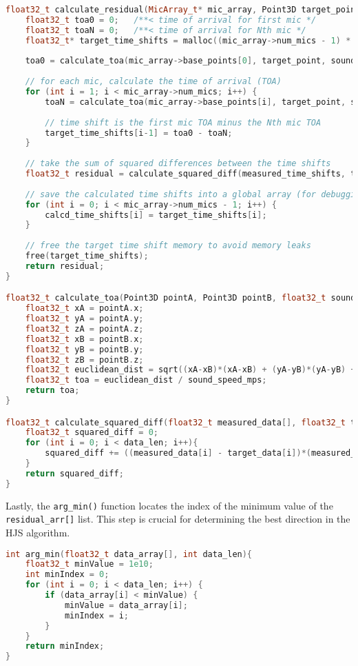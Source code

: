 \documentclass[12pt,a4paper]{report}
\begin{document}
\begin{lstlisting}[language=C++]
float32_t calculate_residual(MicArray_t* mic_array, Point3D target_point, float32_t measured_time_shifts[]) {
	float32_t toa0 = 0;   /**< time of arrival for first mic */
	float32_t toaN = 0;   /**< time of arrival for Nth mic */
	float32_t* target_time_shifts = malloc((mic_array->num_mics - 1) * sizeof(float32_t));
	
	toa0 = calculate_toa(mic_array->base_points[0], target_point, sound_speed_mps);
	
	// for each mic, calculate the time of arrival (TOA)
	for (int i = 1; i < mic_array->num_mics; i++) {
		toaN = calculate_toa(mic_array->base_points[i], target_point, sound_speed_mps);
		
		// time shift is the first mic TOA minus the Nth mic TOA
		target_time_shifts[i-1] = toa0 - toaN;
	}
	
	// take the sum of squared differences between the time shifts
	float32_t residual = calculate_squared_diff(measured_time_shifts, target_time_shifts, mic_array->num_mics - 1);
	
	// save the calculated time shifts into a global array (for debugging / comparing to the real estimates)
	for (int i = 0; i < mic_array->num_mics - 1; i++) {
		calcd_time_shifts[i] = target_time_shifts[i];
	}
	
	// free the target time shift memory to avoid memory leaks
	free(target_time_shifts);
	return residual;
}

float32_t calculate_toa(Point3D pointA, Point3D pointB, float32_t sound_speed_mps) {
	float32_t xA = pointA.x;
	float32_t yA = pointA.y;
	float32_t zA = pointA.z;
	float32_t xB = pointB.x;
	float32_t yB = pointB.y;
	float32_t zB = pointB.z;
	float32_t euclidean_dist = sqrt((xA-xB)*(xA-xB) + (yA-yB)*(yA-yB) + (zA-zB)*(zA-zB));
	float32_t toa = euclidean_dist / sound_speed_mps;
	return toa;
}

float32_t calculate_squared_diff(float32_t measured_data[], float32_t target_data[], int data_len){
	float32_t squared_diff = 0;
	for (int i = 0; i < data_len; i++){
		squared_diff += ((measured_data[i] - target_data[i])*(measured_data[i] - target_data[i]));
	}
	return squared_diff;
}
\end{lstlisting}

Lastly, the \verb|arg_min()| function locates the index of the minimum value of the \verb|residual_arr[]| list. This step is crucial for determining the best direction in the HJS algorithm.

\begin{lstlisting}[language=C++]
int arg_min(float32_t data_array[], int data_len){
	float32_t minValue = 1e10;
	int minIndex = 0;
	for (int i = 0; i < data_len; i++) {
		if (data_array[i] < minValue) {
			minValue = data_array[i];
			minIndex = i;
		}
	}
	return minIndex;
}
\end{lstlisting}
\end{document}
